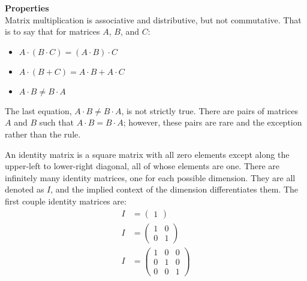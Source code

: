 \textbf{Properties} \\

Matrix multiplication is associative and distributive, but not commutative. That is to say that for matrices $A$, $B$, and $C$:
\begin{itemize}
\item $A \cdot (B \cdot C)=(A \cdot B)\cdot C$
\item $A \cdot (B+C)=A \cdot B + A \cdot C$
\item $A \cdot B \neq B \cdot A$
\end{itemize}

The last equation, $A \cdot B \neq B \cdot A$, is not strictly true. There are pairs of matrices $A$ and $B$ such that $A \cdot B=B \cdot A$; however, these pairs are rare and the exception rather than the rule. \\


An identity matrix is a square matrix with all zero elements except along the upper-left to lower-right diagonal, all of whose elements are one. There are infinitely many identity matrices, one for each possible dimension. They are all denoted as $I$, and the implied context of the dimension differentiates them. The first couple identity matrices are:
\[
\begin{split}
I&=\begin{pmatrix} 1 \end{pmatrix} \\
I&=\begin{pmatrix} 1 & 0 \\ 0 & 1 \end{pmatrix} \\
I&=\begin{pmatrix} 1 & 0 & 0 \\ 0 & 1 & 0 \\ 0 & 0 & 1 \end{pmatrix}
\end{split}
\]

